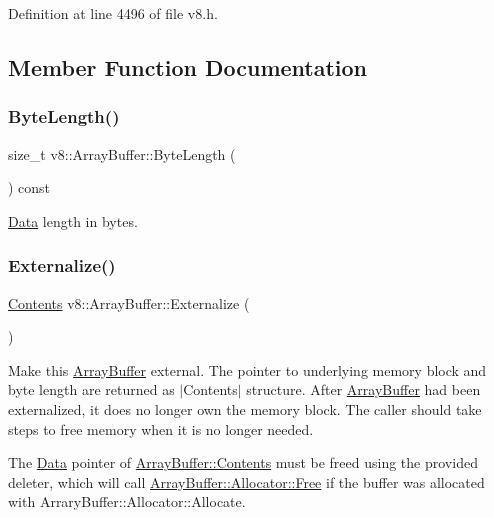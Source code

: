 Definition at line 4496 of file v8.\+h.



\subsection{Member Function Documentation}
\mbox{\label{classv8_1_1ArrayBuffer_af4c4ad8075f74892ed3fa217219a2626}} 
\subsubsection{\texorpdfstring{Byte\+Length()}{ByteLength()}}
{\footnotesize\ttfamily size\+\_\+t v8\+::\+Array\+Buffer\+::\+Byte\+Length (\begin{DoxyParamCaption}{ }\end{DoxyParamCaption}) const}

\mbox{\hyperlink{classv8_1_1Data}{Data}} length in bytes. \mbox{\label{classv8_1_1ArrayBuffer_a8b90b72486cfacb4fbec157f4803f889}} 
\subsubsection{\texorpdfstring{Externalize()}{Externalize()}}
{\footnotesize\ttfamily \mbox{\hyperlink{classv8_1_1ArrayBuffer_1_1Contents}{Contents}} v8\+::\+Array\+Buffer\+::\+Externalize (\begin{DoxyParamCaption}{ }\end{DoxyParamCaption})}

Make this \mbox{\hyperlink{classv8_1_1ArrayBuffer}{Array\+Buffer}} external. The pointer to underlying memory block and byte length are returned as $\vert$\+Contents$\vert$ structure. After \mbox{\hyperlink{classv8_1_1ArrayBuffer}{Array\+Buffer}} had been externalized, it does no longer own the memory block. The caller should take steps to free memory when it is no longer needed.

The \mbox{\hyperlink{classv8_1_1Data}{Data}} pointer of \mbox{\hyperlink{classv8_1_1ArrayBuffer_1_1Contents}{Array\+Buffer\+::\+Contents}} must be freed using the provided deleter, which will call \mbox{\hyperlink{classv8_1_1ArrayBuffer_1_1Allocator_a419f59d2a103a5a8863809d7977c9cd8}{Array\+Buffer\+::\+Allocator\+::\+Free}} if the buffer was allocated with Arrary\+Buffer\+::\+Allocator\+::\+Allocate. \mbox{\label{classv8_1_1ArrayBuffer_ae44291df12ca35de9b519e7372aa640a}} 

